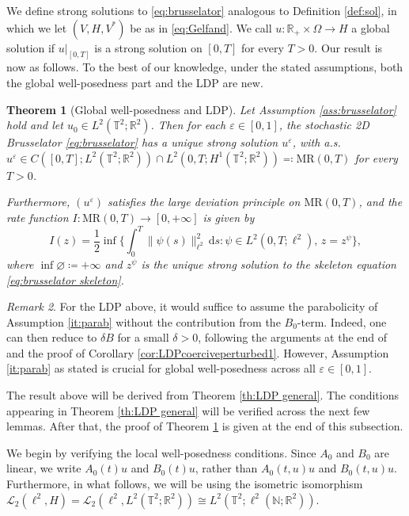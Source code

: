 \documentclass{amsart}
\newcommand{\dd}{\,\mathrm{d}}
\renewcommand{\MR}{\mathrm{MR}}
\newcommand{\<}{\langle}
\newcommand{\?}{\rangle}
\newcommand{\eqqc}{\eqqcolon}
\newcommand{\col}{\colon}
\newcommand{\Tor}{\mathbb{T}}
\renewcommand{\Tor}{\mathbb{T}^2}
\theoremstyle{plain}
\newtheorem{theorem}{Theorem}[section]
\theoremstyle{remark}
\newtheorem{remark}[theorem]{Remark}
\theoremstyle{plain}
\numberwithin{equation}{section}
\def\N{{\mathbb N}}
\def\R{{\mathbb R}}
\newcommand{\Om}{\Omega}
\newcommand{\eps}{\varepsilon}
\begin{document}
 
We define  strong solutions to \eqref{eq:brusselator} analogous to Definition \ref{def:sol}, in which we let $(V,H,V^*)$ be as in  \eqref{eq:Gelfand}. We call $u\col\R_+\times\Om\to H$ a global solution if $u|_{[0,T]}$ is a strong solution on $[0,T]$ for every $T>0$. 
Our result is now as follows. To the best of our knowledge, under the stated assumptions, both the global well-posedness part and the LDP are new. 

\begin{theorem}[Global well-posedness and LDP]\label{th:brusselator}
Let Assumption \ref{ass:brusselator} hold and let $u_0\in L^2(\Tor;\R^2)$. Then for each $\eps\in[0,1]$, the stochastic 2D Brusselator \eqref{eq:brusselator} has a unique strong solution $u^\eps$, with a.s. $u^\eps\in  C([0,T];L^2(\Tor;\R^2))\cap L^2(0,T;H^1(\Tor;\R^2))\eqqc \MR(0,T)$ for every $T>0$.  

Furthermore, $(u^\eps)$ satisfies the large deviation principle on $\MR(0,T)$, and the rate function $I\col \MR(0,T)\to[0,+\infty]$ is given by 
\begin{equation*} 
I(z)=\frac{1}{2}\inf\Big\{\textstyle{\int_0^T}\|\psi(s)\|_{\ell^2}^2\dd s : \psi\in L^2(0,T;\ell^2), \, z=z^{\psi}\Big\},
\end{equation*}
where $\inf\varnothing\coloneqq +\infty$ and $z^\psi $ is the unique strong solution to the skeleton equation \eqref{eq:brusselator skeleton}. 
\end{theorem}
\begin{remark} 
 For the LDP above, it would   suffice to assume the parabolicity of Assumption \ref{it:parab} without the   contribution from the $B_0$-term. Indeed, one can then reduce to $\delta B$ for a small $\delta>0$, following the arguments at the end of \cite[\S6]{AT25} and the proof of Corollary \ref{cor:LDPcoerciveperturbed1}.   However, Assumption \ref{it:parab} as stated is crucial for global well-posedness across all $\eps\in[0,1]$.
\end{remark}
 
The result above will be derived from Theorem \ref{th:LDP general}. 
The conditions appearing in Theorem \ref{th:LDP general} will be verified across the next few lemmas. After that, the proof of Theorem \ref{th:brusselator} is given at the end of this subsection. 
  

We begin by verifying the local well-posedness conditions. Since $A_0$ and $B_0$ are linear, we write $A_0(t)u$ and  $B_0(t)u$, rather than $A_0(t,u)u$ and $B_0(t,u)u$. 
Furthermore, in what follows, we will be using the isometric isomorphism  $\mathscr{L}_2(\ell^2,H)=\mathscr{L}_2(\ell^2,L^2(\Tor;\R^2)) \cong L^2(\Tor;\ell^2(\N;\R^2))$. 
\end{document}
